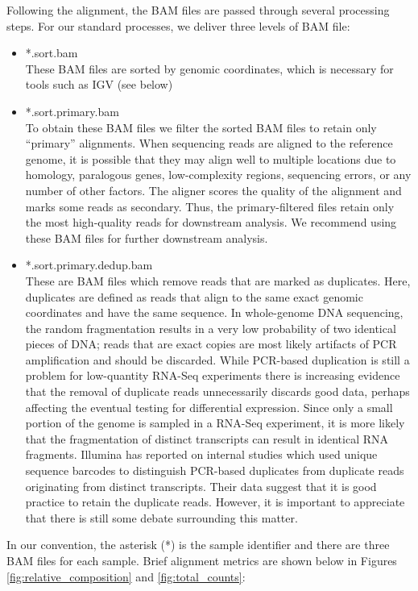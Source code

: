 \documentclass{article}
\begin{document}
{Following the alignment, the BAM files are passed through several processing steps.  For our standard processes, we deliver three levels of BAM file:
\begin{itemize}
\item *.sort.bam \\
These BAM files are sorted by genomic coordinates, which is necessary for tools such as IGV (see below)
\item *.sort.primary.bam \\
To obtain these BAM files we filter the sorted BAM files to retain only ``primary'' alignments.  When sequencing reads are aligned to the reference genome, it is possible that they may align well to multiple locations due to homology, paralogous genes, low-complexity regions, sequencing errors, or any number of other factors.  The aligner scores the quality of the alignment and marks some reads as secondary.  Thus, the primary-filtered files retain only the most high-quality reads for downstream analysis.  We recommend using these BAM files for further downstream analysis.  
\item *.sort.primary.dedup.bam \\
These are BAM files which remove reads that are marked as duplicates.  Here, duplicates are defined as reads that align to the same exact genomic coordinates and have the same sequence.  In whole-genome DNA sequencing, the random fragmentation results in a very low probability of two identical pieces of DNA; reads that are exact copies are most likely artifacts of PCR amplification and should be discarded.  While PCR-based duplication is still a problem for low-quantity RNA-Seq experiments there is increasing evidence that the removal of duplicate reads unnecessarily discards good data, perhaps affecting the eventual testing for differential expression.  Since only a small portion of the genome is sampled in a RNA-Seq experiment, it is more likely that the fragmentation of distinct transcripts can result in identical RNA fragments.  Illumina has reported on internal studies which used unique sequence barcodes to distinguish PCR-based duplicates from duplicate reads originating from distinct transcripts.  Their data suggest that it is good practice to retain the duplicate reads.  However, it is important to appreciate that there is still some debate surrounding this matter.  
\end{itemize}

In our convention, the asterisk (*) is the sample identifier and there are three BAM files for each sample.
Brief alignment metrics are shown below in Figures \ref{fig:relative_composition} and \ref{fig:total_counts}:

}
\end{document}

